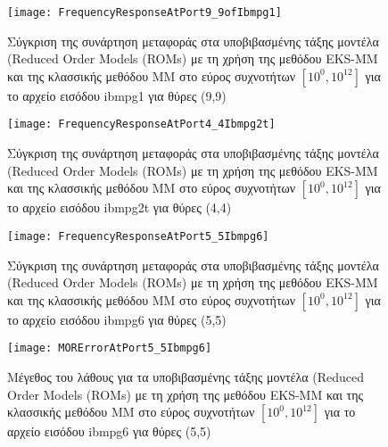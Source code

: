 \begin{figure}[h!]
\caption{Σύγκριση της συνάρτηση μεταφοράς στα υποβιβασμένης τάξης μοντέλα (\textlatin{Reduced Order Models (ROMs)} με τη χρήση της μεθόδου \textlatin{EKS-MM} και της κλασσικής μεθόδου \textlatin{MM} στο εύρος συχνοτήτων $[10^0, 10^{12}]$ για το αρχείο εισόδου \textlatin{ibmpg1} για θύρες (9,9)}
\centering
\texttt{[image: FrequencyResponseAtPort9\_9ofIbmpg1]}
\end{figure}



\begin{figure}[h!]
\caption{Σύγκριση της συνάρτηση μεταφοράς στα υποβιβασμένης τάξης μοντέλα (\textlatin{Reduced Order Models (ROMs)} με τη χρήση της μεθόδου \textlatin{EKS-MM} και της κλασσικής μεθόδου \textlatin{MM} στο εύρος συχνοτήτων $[10^0, 10^{12}]$ για το αρχείο εισόδου \textlatin{ibmpg2t} για θύρες (4,4)}
\centering
\texttt{[image: FrequencyResponseAtPort4\_4Ibmpg2t]}
\end{figure}

\begin{figure}[h!]
\caption{Σύγκριση της συνάρτηση μεταφοράς στα υποβιβασμένης τάξης μοντέλα (\textlatin{Reduced Order Models (ROMs)} με τη χρήση της μεθόδου \textlatin{EKS-MM} και της κλασσικής μεθόδου \textlatin{MM} στο εύρος συχνοτήτων $[10^0, 10^{12}]$ για το αρχείο εισόδου \textlatin{ibmpg6} για θύρες (5,5)}
\centering
\texttt{[image: FrequencyResponseAtPort5\_5Ibmpg6]}
\end{figure}

\begin{figure}[h!]
\caption{Μέγεθος του λάθους για τα υποβιβασμένης τάξης μοντέλα (\textlatin{Reduced Order Models (ROMs)} με τη χρήση της μεθόδου \textlatin{EKS-MM} και της κλασσικής μεθόδου \textlatin{MM} στο εύρος συχνοτήτων $[10^0, 10^{12}]$ για το αρχείο εισόδου \textlatin{ibmpg6} για θύρες (5,5)}
\centering
\texttt{[image: MORErrorAtPort5\_5Ibmpg6]}
\end{figure}
